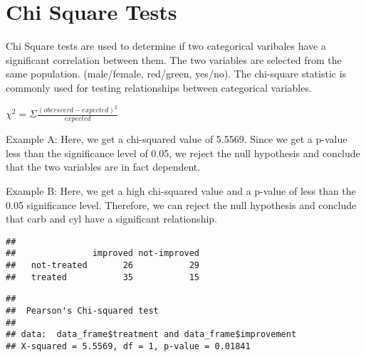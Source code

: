\documentclass[]{article}
\newenvironment{Shaded}{\begin{snugshade}}{\end{snugshade}}
\newcommand{\CommentTok}[1]{\textcolor[rgb]{0.56,0.35,0.01}{\textit{#1}}}
\newcommand{\DataTypeTok}[1]{\textcolor[rgb]{0.13,0.29,0.53}{#1}}
\newcommand{\KeywordTok}[1]{\textcolor[rgb]{0.13,0.29,0.53}{\textbf{#1}}}
\newcommand{\NormalTok}[1]{#1}
\newcommand{\OperatorTok}[1]{\textcolor[rgb]{0.81,0.36,0.00}{\textbf{#1}}}
\newcommand{\OtherTok}[1]{\textcolor[rgb]{0.56,0.35,0.01}{#1}}
\newcommand{\StringTok}[1]{\textcolor[rgb]{0.31,0.60,0.02}{#1}}
\begin{document}
\hypertarget{chi-square-tests}{%
\section{Chi Square Tests}\label{chi-square-tests}}

Chi Square tests are used to determine if two categorical varibales have
a significant correlation between them. The two variables are selected
from the same population. (male/female, red/green, yes/no). The
chi-square statistic is commonly used for testing relationships between
categorical variables.

\(\chi^2=\Sigma \frac {(obersverd - expected)^2}{expected}\)

Example A: Here, we get a chi-squared value of 5.5569. Since we get a
p-value less than the significance level of 0.05, we reject the null
hypothesis and conclude that the two variables are in fact dependent.

Example B: Here, we get a high chi-squared value and a p-value of less
than the 0.05 significance level. Therefore, we can reject the null
hypothesis and conclude that carb and cyl have a significant
relationship.

\begin{Shaded}
\end{Shaded}

\begin{verbatim}
##              
##               improved not-improved
##   not-treated       26           29
##   treated           35           15
\end{verbatim}

\begin{Shaded}
\end{Shaded}

\begin{verbatim}
## 
##  Pearson's Chi-squared test
## 
## data:  data_frame$treatment and data_frame$improvement
## X-squared = 5.5569, df = 1, p-value = 0.01841
\end{verbatim}
\end{document}
